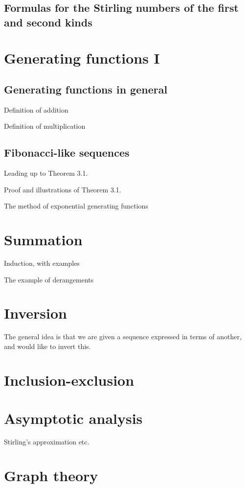 \documentclass{amsart}
\begin{document}
\subsection{Formulas for the Stirling numbers of the first and second kinds}

\newpage
\section{Generating functions I}

\subsection{Generating functions in general}
Definition of addition

Definition of multiplication

\subsection{Fibonacci-like sequences}
Leading up to Theorem 3.1.

\newpage
Proof and illustrations of Theorem 3.1.

\newpage 
The method of exponential generating functions

\newpage
\section{Summation}
Induction, with examples

The example of derangements

\section{Inversion}
The general idea is that we are given a sequence expressed in terms of another, and would like to invert this.

\newpage
\section{Inclusion-exclusion}

\newpage
\section{Asymptotic analysis}
Stirling's approximation etc.

\newpage
\section{Graph theory}
\end{document}
